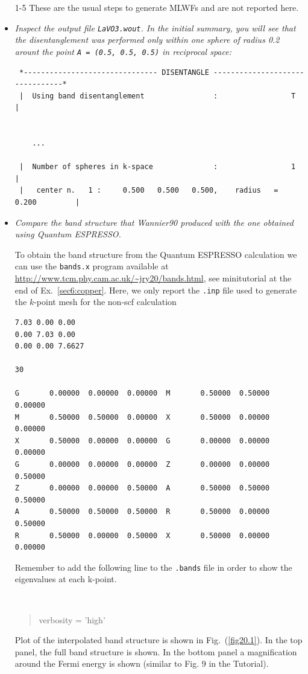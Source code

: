 \begin{itemize}
	\item [1-5] These are the usual steps to generate MLWFs and are not reported here.

	\item {\it Inspect the output file {\tt LaVO3.wout}. In the initial summary, you will see that the disentanglement was
performed only within one sphere of radius 0.2 arount the point {\tt A = (0.5, 0.5, 0.5)} in reciprocal space:}

{\small 
\begin{tcolorbox}[sharp corners,boxrule=0.5pt]
\begin{verbatim}
 *------------------------------- DISENTANGLE --------------------------------*
 |  Using band disentanglement                :                 T             |


 	...

 |  Number of spheres in k-space              :                 1             |
 |   center n.   1 :     0.500   0.500   0.500,    radius   =   0.200         |
\end{verbatim}
\end{tcolorbox}
}

\item {\it Compare the band structure that Wannier90 produced with the one obtained using Quantum ESPRESSO.}

To obtain the band structure from the Quantum ESPRESSO calculation we can use the {\tt bands.x} program available at \url{http://www.tcm.phy.cam.ac.uk/~jry20/bands.html}, see minitutorial at the end of Ex.~\ref{sec6:copper}. Here, we only report the {\tt .inp} file used to generate the $k$-point mesh for the non-scf calculation
{\small 
\begin{tcolorbox}[title=bands.x input file LaVO3.inp,sharp corners,boxrule=0.5pt]
\begin{verbatim}
7.03 0.00 0.00
0.00 7.03 0.00
0.00 0.00 7.6627

30

G       0.00000  0.00000  0.00000  M       0.50000  0.50000  0.00000
M       0.50000  0.50000  0.00000  X       0.50000  0.00000  0.00000
X       0.50000  0.00000  0.00000  G       0.00000  0.00000  0.00000
G       0.00000  0.00000  0.00000  Z       0.00000  0.00000  0.50000
Z       0.00000  0.00000  0.50000  A       0.50000  0.50000  0.50000
A       0.50000  0.50000  0.50000  R       0.50000  0.00000  0.50000
R       0.50000  0.00000  0.50000  X       0.50000  0.00000  0.00000
\end{verbatim}
\end{tcolorbox}
}
Remember to add the following line to the {\tt .bands} file in order to show the eigenvalues at each k-point. 
{\tt
\begin{quote}
verbosity      = 'high'
\end{quote}
}
Plot of the interpolated band structure is shown in Fig.~(\ref{fig20.1}). In the top panel, the full band structure is shown. In the bottom panel a magnification around the Fermi energy is shown (similar to Fig. 9 in the Tutorial).
\end{itemize}

